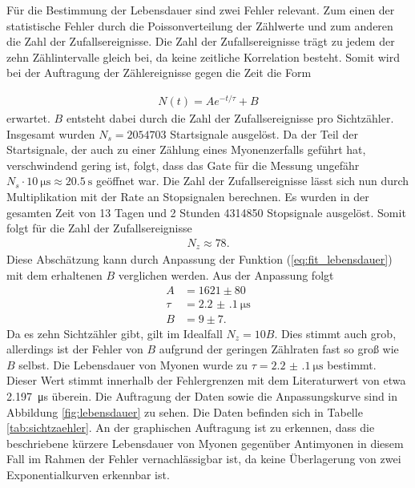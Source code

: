 \FloatBarrier

Für die Bestimmung der Lebensdauer sind zwei Fehler relevant. Zum einen der statistische Fehler durch die Poissonverteilung der Zählwerte und zum anderen die Zahl der Zufallsereignisse. Die Zahl der Zufallsereignisse trägt zu jedem der zehn Zählintervalle gleich bei, da keine zeitliche Korrelation besteht. Somit wird bei der Auftragung der Zählereignisse gegen die Zeit die Form

\begin{align}
  N(t)=A e^{-t/\tau}+B
  \label{eq:fit_lebensdauer}
\end{align}
 erwartet. $B$ entsteht dabei durch die Zahl der Zufallsereignisse pro Sichtzähler.
Insgesamt wurden $N_s=2054703$ Startsignale ausgelöst. Da der Teil der Startsignale, der auch zu einer Zählung eines Myonenzerfalls geführt hat, verschwindend gering ist, folgt, dass das Gate für die Messung ungefähr $N_s \cdot \SI{10}{\micro\second}\approx\SI{20.5}{\second}$ geöffnet war. Die Zahl der Zufallsereignisse lässt sich nun durch Multiplikation mit der Rate an Stopsignalen berechnen. Es wurden in der gesamten Zeit von 13 Tagen und 2 Stunden 4314850 Stopsignale ausgelöst. Somit folgt für die Zahl der Zufallsereignisse 
\begin{align*}
  N_z\approx 78.
\end{align*}
Diese Abschätzung kann durch Anpassung der Funktion (\ref{eq:fit_lebensdauer}) mit dem erhaltenen $B$ verglichen werden. Aus der Anpassung folgt
\begin{align*}
  A&=1621 \pm 80\\
  \tau&=\SI[separate-uncertainty = true]{2.2(1)}{\micro\second}\\
  B&=9 \pm 7.
\end{align*}
Da es zehn Sichtzähler gibt, gilt im Idealfall $N_z=10B$. Dies stimmt auch grob, allerdings ist der Fehler von $B$ aufgrund der geringen Zählraten fast so groß wie $B$ selbst. Die Lebensdauer von Myonen wurde zu $\tau = \SI[separate-uncertainty = true]{2.2(1)}{\micro\second}$ bestimmt. Dieser Wert stimmt innerhalb der Fehlergrenzen mit dem Literaturwert von etwa \SI{2.197}{\micro\second}\cite{pdg} überein. Die Auftragung der Daten sowie die Anpassungskurve sind in Abbildung \ref{fig:lebensdauer} zu sehen. Die Daten befinden sich in Tabelle \ref{tab:sichtzaehler}. An der graphischen Auftragung ist zu erkennen, dass die beschriebene kürzere Lebensdauer von Myonen gegenüber Antimyonen in diesem Fall im Rahmen der Fehler vernachlässigbar ist, da keine Überlagerung von zwei Exponentialkurven erkennbar ist.

